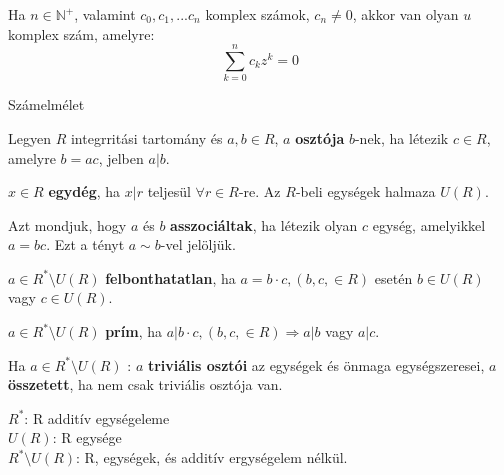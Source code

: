 \begin{frame}
\begin{tcolorbox}[title={Tétel: Az algebra alaptétele}]
Ha $n \in \mathbb{N}^+$, valamint $c_0, c_1, ... c_n$ komplex számok, $c_n \neq 0$, akkor van olyan $u$ komplex szám, amelyre:\\
$$\sum_{k = 0}^n c_kz^k = 0$$
\end{tcolorbox}
\end{frame}

\begin{frame}[plain]
\begin{tcolorbox}[center, colback={myyellow}, coltext={black}, colframe={myyellow}]
    {\Huge Számelmélet}
    \mmedskip
\end{tcolorbox}
\end{frame}

\begin{frame}
  \begin{tcolorbox}[title={Oszthatóság egységelemes integritási tarományban (Emlékeztető)}]
    Legyen $R$ integrritási tartomány és $a, b \in R$, $a$ \textbf{osztója} $b$-nek, ha létezik $c \in R$, amelyre $b = ac$, jelben $a | b$.\\
    \mmedskip

    $x \in R$ \textbf{egydég}, ha $x | r$ teljesül ${\forall}r \in R$-re. Az $R$-beli egységek halmaza $U(R)$.\\
    \mmedskip

    Azt mondjuk, hogy $a$ és $b$ \textbf{asszociáltak}, ha létezik olyan $c$ egység, amelyikkel $a = bc$. Ezt a tényt $a \sim b$-vel jelöljük.\\
    \mmedskip

    $a \in R^*{\setminus}U(R)$ \textbf{felbonthatatlan}, ha $a = b \cdot c, (b, c, \in R)$ esetén $b \in U(R)$ vagy $c \in U(R)$.\\
    \mmedskip

    $a \in R^*{\setminus}U(R)$ \textbf{prím}, ha $a | b \cdot c, (b, c, \in R) \Rightarrow a | b$ vagy $a | c$.\\
    \mmedskip

    Ha $a \in R^*{\setminus}U(R)$ : $a$ \textbf{triviális osztói} az egységek és önmaga egységszeresei, $a$ \textbf{összetett}, ha nem csak triviális osztója van.\\
    \mmedskip

    $R^*$: R additív egységeleme\\
    $U(R)$: R egysége\\
    $R^*{\setminus}U(R)$: R, egységek, és additív ergységelem nélkül.
  \end{tcolorbox}
\end{frame}


